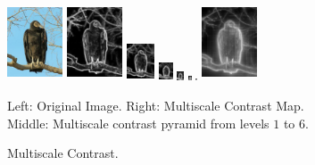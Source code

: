 \documentclass[10pt,twocolumn,letterpaper]{article}
\begin{document}
\begin{figure}[b]
\begin{center}    
\includegraphics[width=0.65in,height=0.9in]{./Figures/pyramid/5_145_145839raw.jpg} \hspace{2mm}
 \includegraphics[width=0.65in,height=0.9in]{./Figures/pyramid/5_145_145839_p0.jpg} 
 \includegraphics[width=0.325in,height=0.45in]{./Figures/pyramid/5_145_145839_p1.jpg} 
\includegraphics[width=0.1625in,height=0.225in]{./Figures/pyramid/5_145_145839_p2.jpg} 
\includegraphics[width=0.08125in,height=0.1125in]{./Figures/pyramid/5_145_145839_p3.jpg} 
 \includegraphics[width=0.040625in,height=0.0575in]{./Figures/pyramid/5_145_145839_p4.jpg} 
 \includegraphics[width=0.0203125in,height=0.02825in]{./Figures/pyramid/5_145_145839_p5.jpg} \hspace{1mm}
 \includegraphics[width=0.65in,height=0.9in]{./Figures/pyramid/5_145_145839.jpg} \\   
\caption{Multiscale Contrast.}\small{Left: Original Image. Right: Multiscale Contrast Map. \\
Middle: Multiscale contrast pyramid from levels $1$ to $6$.} \label{fig:multiscale}
\end{center}
\end{figure}
\end{document}

